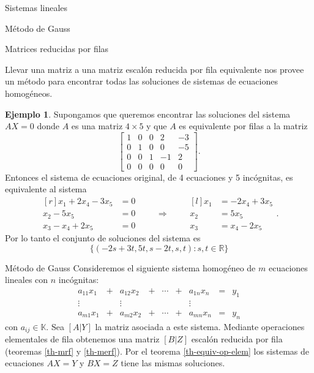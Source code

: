 \documentclass[a4paper,12pt,twoside,spanish]{amsbook}
\theoremstyle{definition}
\newtheorem{ejemplo}{Ejemplo}[section]
\theoremstyle{remark}
\newcommand{\R}{\mathbb R}
\newcommand{\K}{\mathbb K}
\begin{document}
\begin{chapter}{Sistemas lineales}
\begin{section}{Método de Gauss }
\begin{subsection}{Matrices reducidas por filas}
				
			
				
	
				
				Llevar una matriz a una matriz  escalón reducida por fila equivalente nos provee un método para encontrar todas las soluciones de sistemas de ecuaciones homogéneos.
				
				\begin{ejemplo}
					Supongamos que queremos encontrar las soluciones del sistema $AX = 0$ donde $A$ es una matriz $4 \times 5$ y que $A$ es equivalente por filas a la matriz
					\begin{equation*}
					\begin{bmatrix} 1&0&0&2&-3 \\ 0&1&0&0&-5 \\ 0&0&1&-1&2 \\ 0&0&0&0&0\end{bmatrix}.
					\end{equation*} 
					Entonces el sistema de ecuaciones original, de 4 ecuaciones y 5 incógnitas,  es equivalente al sistema
					\begin{equation*}
					\begin{matrix*}[r]
					x_1 +2x_4 -3x_5 &= 0 \\ x_2 -5x_5 &= 0 \\ x_3-x_4+2x_5 &= 0
					\end{matrix*} 
					\qquad \Rightarrow \qquad 
					\begin{matrix*}[l]
					x_1  &= -2x_4 +3x_5 \\ x_2  &= 5x_5 \\ x_3 &= x_4-2x_5
					\end{matrix*}. 
					\end{equation*}
					Por  lo tanto el conjunto de soluciones del sistema es
					\begin{equation*}
					\{(-2s +3t,  5t,  s-2t, s, t): s,t \in \R\}
					\end{equation*}
				\end{ejemplo}   
			\end{subsection}
			
			
			\begin{subsection}{Método de Gauss} Consideremos el siguiente sistema homogéneo de $m$ ecuaciones lineales con $n$ incógnitas:
				\begin{equation*}
				\begin{matrix}
				a_{11}x_1& + &a_{12}x_2& + &\cdots& + &a_{1n}x_n &= &y_1\\
				\vdots&  &\vdots& &&  &\vdots \\
				a_{m1}x_1& + &a_{m2}x_2& + &\cdots& + &a_{mn}x_n &=&y_n
				\end{matrix}
				\end{equation*}
				con $a_{ij} \in \K$. Sea $[A | Y]$ la matriz asociada a este sistema. Mediante operaciones elementales de fila obtenemos una matriz $[B|Z]$ escalón reducida por fila (teoremas \ref{th-mrf} y \ref{th-merf}). Por el teorema \ref{th-equiv-op-elem} los sistemas de ecuaciones $AX=Y$ y $BX=Z$ tiene las mismas soluciones. 
				

\end{subsection}
\end{section}
\end{chapter}
\end{document}

